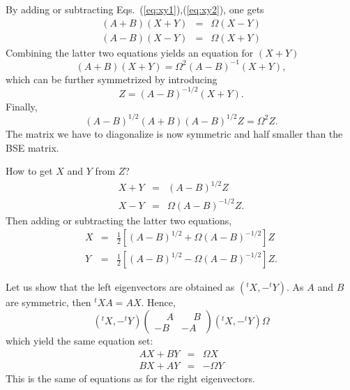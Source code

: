 \documentclass[aps,prb,reprint,showpacs]{revtex4-1}
\def\half{\frac{1}{2}}
\begin{document}
By adding or subtracting Eqs.~(\ref{eq:xy1}),(\ref{eq:xy2}), one gets
\begin{subequations}
\begin{eqnarray}
 ( A + B ) ( X + Y ) & = &  \Omega ( X - Y ) \\
 ( A - B ) ( X - Y ) & = &  \Omega ( X + Y ) 
\end{eqnarray}
\end{subequations}
Combining the latter two equations yields an equation for $(X+Y)$
\begin{equation}
 ( A + B ) ( X+Y ) = \Omega^2 (A-B)^{-1} (X+Y) ,
\end{equation}
which can be further symmetrized by introducing
\begin{equation}
 Z = (A-B)^{-1/2} (X+Y) .
\end{equation}
Finally,
\begin{equation}
 (A-B)^{1/2}(A+B)(A-B)^{1/2} Z = \Omega^2 Z .
\end{equation}
The matrix we have to diagonalize is now symmetric and half smaller than the BSE matrix.

How to get $X$ and $Y$ from $Z$? 
\begin{subequations}
\begin{eqnarray}
  X + Y &=& (A-B)^{1/2} Z \\
  X - Y &=& \Omega (A-B)^{-1/2} Z .
\end{eqnarray}
\end{subequations}
Then adding or subtracting the latter two equations,
\begin{subequations}
\begin{eqnarray}
  X  &=&  \half \left[ (A-B)^{1/2} + \Omega (A-B)^{-1/2}  \right] Z  \\
  Y  &=&  \half \left[ (A-B)^{1/2} - \Omega (A-B)^{-1/2}  \right] Z .
\end{eqnarray}
\end{subequations}

Let us show that the left eigenvectors are obtained as $( ^tX , - ^t Y)$.
As $A$ and $B$ are symmetric, then $^tX A = A X$.
Hence,
\begin{equation}
 ( ^tX , - ^t Y)
 \left( 
   \begin{array}{cc}
      \phantom{-}A  &  \phantom{-}B \\
      -B  & -A 
   \end{array}
 \right) 
 ( ^tX , - ^t Y)
  \Omega
\end{equation}
which yield the same equation set:
\begin{subequations}
\begin{eqnarray}
  AX + BY & = & \Omega X  \\
  BX + AY & = &-\Omega Y 
\end{eqnarray}
\end{subequations}
This is the same of equations as for the right eigenvectors.
\end{document}
